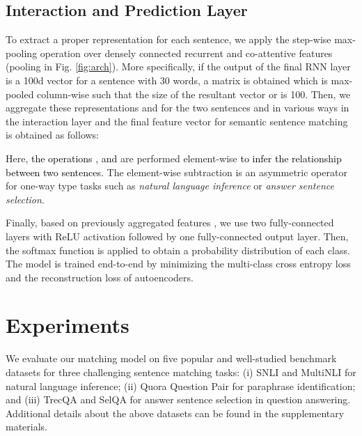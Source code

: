 \documentclass[letterpaper]{article} \usepackage{aaai19}  \usepackage{times}  \usepackage{helvet}  \usepackage{courier}  \usepackage{url}  \usepackage{graphicx}  \frenchspacing  \setlength{\pdfpagewidth}{8.5in}  \setlength{\pdfpageheight}{11in}
\newcommand\nj[1]{\textcolor{black}{#1}}
\begin{document}
\subsection{Interaction and Prediction Layer}
To extract a proper representation for each sentence, we apply the step-wise max-pooling operation over densely connected recurrent and co-attentive features (pooling in Fig. \ref{fig:arch}). More specifically, if the output of the final RNN layer is a 100d vector for a sentence with 30 words, a  matrix is obtained which is max-pooled column-wise such that the size of the resultant vector  or  is 100.  
Then, we aggregate these representations  and  for the two sentences  and  in various ways in the interaction layer and the final feature vector  for semantic sentence matching is obtained as follows:

Here, \nj{the operations ,  and  
} are performed element-wise \nj{to infer the relationship between two sentences.} The element-wise subtraction  is an asymmetric operator for one-way type tasks such as \textit{natural language inference} or \textit{answer sentence selection}. 

Finally, based on previously aggregated features , we use two fully-connected layers with ReLU activation followed by one fully-connected output layer. Then, the softmax function is applied to obtain a probability distribution of each class.
The model is trained end-to-end by minimizing the multi-class cross entropy loss and the reconstruction loss of autoencoders.



\section{Experiments}
\label{sec:exp}



We evaluate our matching model on five popular and well-studied benchmark datasets for three challenging sentence matching tasks:  (i) SNLI and MultiNLI for natural language inference; (ii) Quora Question Pair for paraphrase identification; and (iii) TrecQA and SelQA for answer sentence selection in question answering. 
Additional details about the above datasets
can be found in the supplementary materials.
\end{document}
